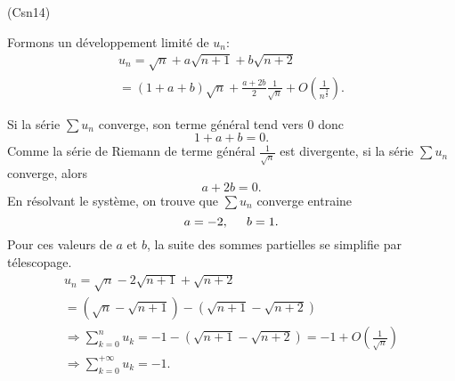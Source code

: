 \begin{tiny}(Csn14)\end{tiny} Formons un développement limité de $u_n$:
\begin{multline*}
 u_n = \sqrt{n} + a\sqrt{n+1} + b\sqrt{n+2} \\
 = (1+a+b)\sqrt{n} + \frac{a+2b}{2}\frac{1}{\sqrt{n}} + O(\frac{1}{n^{\frac{3}{2}}}).
\end{multline*}

Si la série $\sum u_n$ converge, son terme général tend vers $0$ donc
\[
 1 + a + b = 0.
\]
Comme la série de Riemann de terme général $\frac{1}{\sqrt{n}}$ est divergente, si la série $\sum u_n$ converge, alors
\[
 a + 2 b =0.
\]
 En résolvant le système, on trouve que $\sum u_n$ converge entraine 
\[
 a = -2, \hspace{0.5cm} b = 1.
\]
Pour ces valeurs de $a$ et $b$, la suite des sommes partielles se simplifie par télescopage.
\begin{multline*}
 u_n = \sqrt{n} - 2\sqrt{n+1} + \sqrt{n+2} \\
 = \left( \sqrt{n} - \sqrt{n+1}\right) - \left( \sqrt{n+1} - \sqrt{n+2}\right)\\
 \Rightarrow
 \sum_{k=0}^{n}u_k
 = -1 - \left( \sqrt{n+1} - \sqrt{n+2}\right)
 = -1 + O(\frac{1}{\sqrt{n}}) \\
\Rightarrow
\sum_{k=0}^{+\infty}u_k = -1.
\end{multline*}
